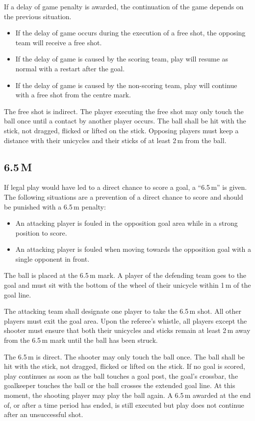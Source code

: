 If a delay of game penalty is awarded, the continuation of the game depends on the previous situation.
\begin{itemize}
	\item If the delay of game occurs during the execution of a free shot, the opposing team will receive a free shot.
	\item If the delay of game is caused by the scoring team, play will resume as normal with a restart after the goal.
	\item If the delay of game is caused by the non-scoring team, play will continue with a free shot from the centre mark.
\end{itemize}

The free shot is indirect.
The player executing the free shot may only touch the ball once until a contact by another player occurs.
The ball shall be hit with the stick, not dragged, flicked or lifted on the stick.
Opposing players must keep a distance with their unicycles and their sticks of at least 2\,m from the ball.

\subsection{6.5\,M \label{subsec:hockey_penalties_65m}}
If legal play would have led to a direct chance to score a goal, a ``6.5\,m'' is given.
The following situations are a prevention of a direct chance to score and should be punished with a 6.5\,m penalty:
\begin{itemize}
\item An attacking player is fouled in the opposition goal area while in a strong position to score.
\item An attacking player is fouled when moving towards the opposition goal with a single opponent in front.
\end{itemize}
The ball is placed at the 6.5\,m mark.
A player of the defending team goes to the goal and must sit with the bottom of the wheel of their unicycle within 1\,m of the goal line.

The attacking team shall designate one player to take the 6.5\,m shot.
All other players must exit the goal area.
Upon the referee’s whistle, all players except the shooter must ensure that both their unicycles and sticks remain at least 2\,m away from the 6.5\,m mark until the ball has been struck.

The 6.5\,m is direct.
The shooter may only touch the ball once.
The ball shall be hit with the stick, not dragged, flicked or lifted on the stick.
If no goal is scored, play continues as soon as the ball touches a goal post, the goal's crossbar, the goalkeeper touches the ball or the ball crosses the extended goal line.
At this moment, the shooting player may play the ball again.
A 6.5\,m awarded at the end of, or after a time period has ended, is still executed but play does not continue after an unsuccessful shot.

